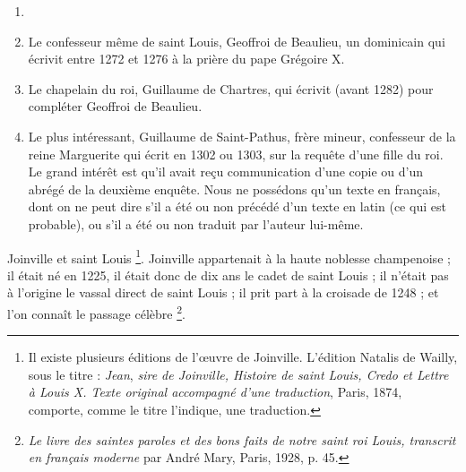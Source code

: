 \documentclass[french,twoside]{book} %
\begin{document}
\begin{enumerate}[itemsep=0pt,]
\item[] \hspace{-1.5em}{\bfseries Il faut y suppléer par les vies :}
\item Le confesseur même de saint Louis, Geoffroi de Beaulieu, un dominicain qui écrivit entre 1272 et 1276 à la prière du pape Grégoire X.
\item Le chapelain du roi, Guillaume de Chartres, qui écrivit (avant 1282) pour compléter Geoffroi de Beaulieu.
\item Le plus intéressant, Guillaume de Saint-Pathus, frère mineur, confesseur de la reine Marguerite qui écrit en 1302 ou 1303, sur la requête d’une fille du roi. Le grand intérêt est qu’il avait reçu communication d’une copie ou d’un abrégé de la deuxième enquête. Nous ne possédons qu’un texte en français, dont on ne peut dire s’il a été ou non précédé d’un texte en latin (ce qui est probable), ou s’il a été ou non traduit par l’auteur lui-même.

\end{enumerate}\noindent Joinville et saint Louis \footnote{ Il existe plusieurs éditions de l’œuvre de Joinville. L’édition Natalis de Wailly, sous le titre : {\itshape Jean}, {\itshape sire de Joinville, Histoire de saint Louis, Credo et Lettre à Louis X. Texte original accompagné d’une traduction}, Paris, 1874, comporte, comme le titre l’indique, une traduction.}. Joinville appartenait à la haute noblesse champenoise ; il était né en 1225, il était donc de dix ans  
\label{p5} le cadet de saint Louis ; il n’était pas à l’origine le vassal direct de saint Louis ; il prit part à la croisade de 1248 ; et l’on connaît le passage célèbre \footnote{{\itshape Le livre des saintes paroles et des bons faits de notre saint roi Louis, transcrit en français moderne} par André Mary, Paris, 1928, p. 45.}.\par
\end{document}
